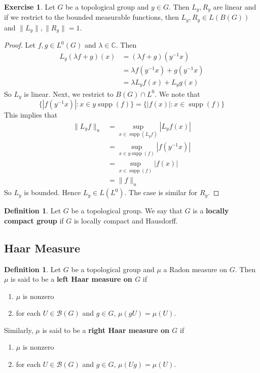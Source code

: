 \documentclass[12pt]{amsart}
\theoremstyle{definition}
\newtheorem{defn}[definition]{Definition}
\newtheorem{ex}[definition]{Exercise}
\newcommand{\lam}{\lambda}
\newcommand{\C}{\mathbb{C}}
\newcommand{\MB}{\mathcal{B}}
\DeclareMathOperator{\supp}{supp}
\newcommand{\lex}[1]{\label{ex:#1}}
\newcommand{\ld}[1]{\label{defn:#1}}
\begin{document}
	\begin{ex} \lex{00000} 
		Let $G$ be a topological group and $y \in G$. Then $L_y, R_y$ are linear and if we restrict to the bounded measurable functions, then  $L_y, R_y \in L(B(G))$ and $\|L_y\|, \|R_y\| = 1$. 
	\end{ex}
	
	\begin{proof}
		Let $f, g \in L^0(G)$ and $\lam \in \C$. Then 
		\begin{align*}
			L_y(\lam f+g)(x)
			& = (\lam f+g)(y^{-1}x) \\
			& = \lam f(y^{-1}x) + g(y^{-1}x) \\
			& = \lam L_yf(x) + L_yg(x)
		\end{align*}
		So $L_y$ is linear. Next, we restrict to $B(G) \cap L^0$. We note that $$\{|f(y^{-1}x)|: x \in y\supp(f)\} = \{|f(x)|: x \in \supp(f)\}$$ This implies that 
		\begin{align*}
			\|L_yf \|_u 
			& = \sup_{x \in \supp(L_yf)} |L_yf(x)| \\
			& = \sup_{x \in y\supp(f)} |f(y^{-1}x)| \\
			& = \sup_{x \in \supp(f)} |f(x)| \\ 
			& = \|f\|_u
		\end{align*} 
		So $L_y$ is bounded. Hence $L_y \in L(L^0)$. The case is similar for $R_y$.
	\end{proof}
	
	\begin{defn} \ld{00000} 
		Let $G$ be a topological group. We say that $G$ is a \textbf{locally compact group} if $G$ is locally compact and Hausdorff.
	\end{defn}








	\newpage
	
	\subsection{Haar Measure}
	
	\begin{defn} \ld{00000} 
		Let $G$ be a topological group and $\mu$ a Radon measure on $G$. Then $\mu$ is said to be a \textbf{left Haar measure on $G$} if 
		\begin{enumerate}
			\item $\mu$ is nonzero  
			\item for each $U \in \MB(G)$ and $g \in G$, $\mu(gU) = \mu(U)$.  
		\end{enumerate}
		Similarly, $\mu$ is said to be a \textbf{right Haar measure on $G$} if 
		\begin{enumerate}
			\item $\mu$ is nonzero  
			\item for each $U \in \MB(G)$ and $g \in G$, $\mu(Ug) = \mu(U)$.  
		\end{enumerate}
	\end{defn}
	
\end{document}
